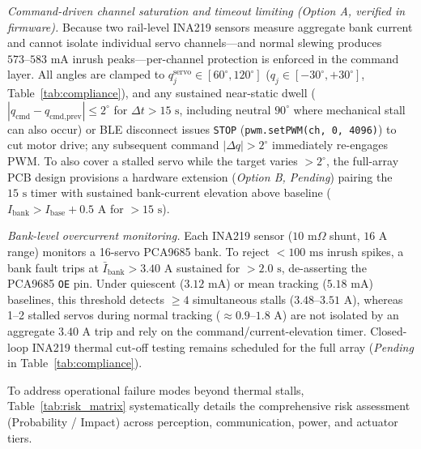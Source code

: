 \documentclass[lettersize,journal]{IEEEtran}
\begin{document}
	\textit{Command-driven channel saturation and timeout limiting (Option A, verified in firmware).} Because two rail-level INA219 sensors measure aggregate bank current and cannot isolate individual servo channels—and normal slewing produces $573\text{--}583\text{ mA}$ inrush peaks—per-channel protection is enforced in the command layer. All angles are clamped to $q_j^{\text{servo}} \in [60^\circ, 120^\circ]$ ($q_j \in [-30^\circ, +30^\circ]$, Table~\ref{tab:compliance}), and any sustained near-static dwell ($|q_{\text{cmd}} - q_{\text{cmd,prev}}| \le 2^\circ$ for $\Delta t > 15\text{ s}$, including neutral $90^\circ$ where mechanical stall can also occur) or BLE disconnect issues \texttt{STOP} (\texttt{pwm.setPWM(ch, 0, 4096)}) to cut motor drive; any subsequent command $|\Delta q| > 2^\circ$ immediately re-engages PWM. To also cover a stalled servo while the target varies $>2^\circ$, the full-array PCB design provisions a hardware extension (\textit{Option B, Pending}) pairing the $15\text{ s}$ timer with sustained bank-current elevation above baseline ($I_{\text{bank}} > I_{\text{base}} + 0.5\text{ A}$ for $>15\text{ s}$).
	
	\textit{Bank-level overcurrent monitoring.} Each INA219 sensor ($10\text{ m}\Omega$ shunt, $16\text{ A}$ range) monitors a 16-servo PCA9685 bank. To reject $<100\text{ ms}$ inrush spikes, a bank fault trips at $\bar{I}_{\text{bank}} > 3.40\text{ A}$ sustained for $> 2.0\text{ s}$, de-asserting the PCA9685 \texttt{OE} pin. Under quiescent ($3.12\text{ mA}$) or mean tracking ($5.18\text{ mA}$) baselines, this threshold detects $\ge 4$ simultaneous stalls ($3.48\text{--}3.51\text{ A}$), whereas 1--2 stalled servos during normal tracking ($\approx 0.9\text{--}1.8\text{ A}$) are not isolated by an aggregate $3.40\text{ A}$ trip and rely on the command/current-elevation timer. Closed-loop INA219 thermal cut-off testing remains scheduled for the full array (\textit{Pending} in Table~\ref{tab:compliance}).
	
	To address operational failure modes beyond thermal stalls, Table~\ref{tab:risk_matrix} systematically details the comprehensive risk assessment (Probability / Impact) across perception, communication, power, and actuator tiers.
	
\end{document}
